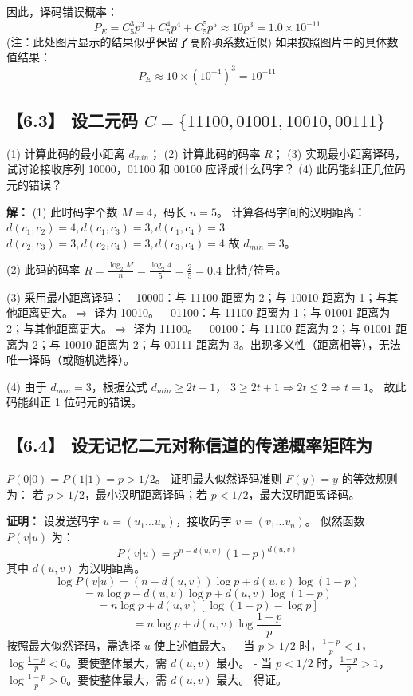 \documentclass[11pt, a4paper]{article}
\begin{document}
因此，译码错误概率：
\[ P_E = C_5^3 p^3 + C_5^4 p^4 + C_5^5 p^5 \approx 10 p^3 = 1.0 \times 10^{-11} \]
(注：此处图片显示的结果似乎保留了高阶项系数近似)
如果按照图片中的具体数值结果：
\[ P_E \approx 10 \times (10^{-4})^3 = 10^{-11} \]

\subsection*{【6.3】 设二元码 $C=\{11100, 01001, 10010, 00111\}$}
(1) 计算此码的最小距离 $d_{min}$；
(2) 计算此码的码率 $R$；
(3) 实现最小距离译码，试讨论接收序列 10000，01100 和 00100 应译成什么码字？
(4) 此码能纠正几位码元的错误？

\textbf{解：}
(1) 此时码字个数 $M=4$，码长 $n=5$。
计算各码字间的汉明距离：
$d(c_1, c_2)=4, d(c_1, c_3)=3, d(c_1, c_4)=3$
$d(c_2, c_3)=3, d(c_2, c_4)=3, d(c_3, c_4)=4$
故 $d_{min} = 3$。

(2) 此码的码率 $R = \frac{\log_2 M}{n} = \frac{\log_2 4}{5} = \frac{2}{5} = 0.4$ 比特/符号。

(3) 采用最小距离译码：
- 10000：与 11100 距离为 2；与 10010 距离为 1；与其他距离更大。$\Rightarrow$ 译为 10010。
- 01100：与 11100 距离为 1；与 01001 距离为 2；与其他距离更大。$\Rightarrow$ 译为 11100。
- 00100：与 11100 距离为 2；与 01001 距离为 2；与 10010 距离为 2；与 00111 距离为 3。出现多义性（距离相等），无法唯一译码（或随机选择）。

(4) 由于 $d_{min}=3$，根据公式 $d_{min} \ge 2t+1$，
$3 \ge 2t+1 \Rightarrow 2t \le 2 \Rightarrow t=1$。
故此码能纠正 1 位码元的错误。

\subsection*{【6.4】 设无记忆二元对称信道的传递概率矩阵为}
$P(0|0)=P(1|1)=p > 1/2$。
证明最大似然译码准则 $F(y)=y$ 的等效规则为：
若 $p > 1/2$，最小汉明距离译码；若 $p < 1/2$，最大汉明距离译码。

\textbf{证明：}
设发送码字 $u=(u_1 \dots u_n)$，接收码字 $v=(v_1 \dots v_n)$。
似然函数 $P(v|u)$ 为：
\[ P(v|u) = p^{n-d(u,v)} (1-p)^{d(u,v)} \]
其中 $d(u,v)$ 为汉明距离。
\[ \log P(v|u) = (n-d(u,v)) \log p + d(u,v) \log (1-p) \]
\[ = n \log p - d(u,v) \log p + d(u,v) \log (1-p) \]
\[ = n \log p + d(u,v) [\log(1-p) - \log p] \]
\[ = n \log p + d(u,v) \log \frac{1-p}{p} \]
按照最大似然译码，需选择 $u$ 使上述值最大。
- 当 $p > 1/2$ 时，$\frac{1-p}{p} < 1$，$\log \frac{1-p}{p} < 0$。要使整体最大，需 $d(u,v)$ 最小。
- 当 $p < 1/2$ 时，$\frac{1-p}{p} > 1$，$\log \frac{1-p}{p} > 0$。要使整体最大，需 $d(u,v)$ 最大。
得证。
\end{document}
